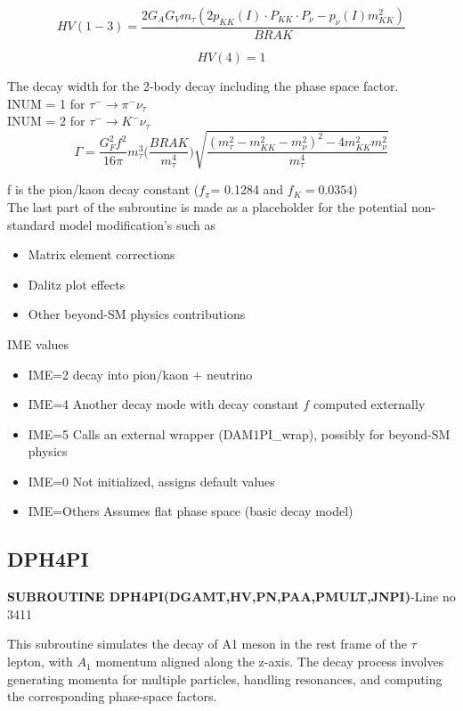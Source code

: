 \documentclass[12pt]{article}
\begin{document}
\[ HV(1-3) = \frac{2G_AG_Vm_\tau (2p_{KK}(I) \cdot P_{KK} \cdot P_\nu - p_\nu(I) m_{KK}^2)}{BRAK}  \]

\[HV(4) = 1 \]

The decay width for the 2-body decay including the phase space factor.\\

INUM = 1 for $\tau^- \rightarrow \pi^- \nu_\tau$\\
INUM = 2 for $\tau^- \rightarrow K^- \nu_\tau$\\

\[\Gamma = \frac{G_F^2 f^2}{16\pi}m_\tau^3\Big(\frac{BRAK}{m_\tau^4}\Big)\sqrt{\frac{(m_\tau^2-m_{KK}^2-m_\nu^2)^2-4m_{KK}^2m_\nu^2}{m_\tau^4}}\]

f is the pion/kaon decay constant ($f_\pi$= 0.1284 and $f_{K} = 0.0354$)\\

The last part of the subroutine is made as a placeholder for the potential non-standard model modification's such as
\begin{itemize}
    \item Matrix element corrections
    \item Dalitz plot effects
    \item Other beyond-SM physics contributions
\end{itemize}

IME values\\
\begin{itemize}
    \item IME=2 decay into pion/kaon + neutrino
    \item IME=4 Another decay mode with decay constant $f$ computed externally 
    \item IME=5 Calls an external wrapper (DAM1PI\_wrap), possibly for beyond-SM physics
    \item IME=0 Not initialized, assigns default values
    \item IME=Others Assumes flat phase space (basic decay model)
\end{itemize}

\subsection{DPH4PI}
\textbf{SUBROUTINE DPH4PI(DGAMT,HV,PN,PAA,PMULT,JNPI)}-Line no 3411

This subroutine simulates the decay of A1 meson in the rest frame of the $\tau$ lepton, with $A_1$ momentum aligned along the z-axis. The decay process involves generating momenta for multiple particles, handling resonances, and computing the corresponding phase-space factors.
\end{document}
